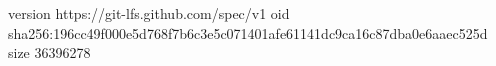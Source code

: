 version https://git-lfs.github.com/spec/v1
oid sha256:196cc49f000e5d768f7b6c3e5c071401afe61141dc9ca16c87dba0e6aaec525d
size 36396278
